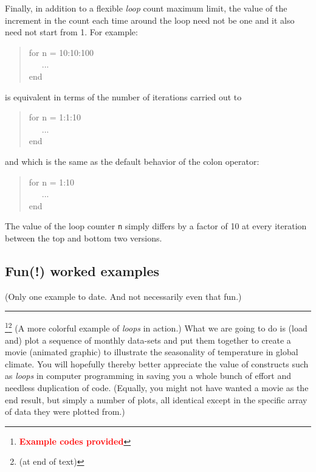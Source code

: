 \documentclass{tufte-book} %
\newenvironment{docspec}{\begin{quotation}\ttfamily\parskip0pt\parindent0pt\ignorespaces}{\end{quotation}}
\begin{document}
\noindent Finally, in addition to a flexible \textit{loop} count maximum limit, the value of the increment in the count each time around the loop need not be one and it also need not start from 1. For example:
\begin{docspec}
for n = 10:10:100
\\ \ \ \ ...
\\end
\end{docspec}
is  equivalent in terms of the number of iterations carried out to
\begin{docspec}
for n = 1:1:10
\\ \ \ \ ...
\\end
\end{docspec}
and which is the same as the default behavior of the colon operator:
\begin{docspec}
for n = 1:10
\\ \ \ \ ...
\\end
\end{docspec}
The value of  the loop counter \texttt{n} simply differs by a factor of 10 at every iteration between the top and bottom two versions.

\newpage 


\subsection{Fun(!) worked examples}

(Only one example to date. And not necessarily even that fun.)

\vspace{1mm}
\noindent\rule{4cm}{0.5pt}
\vspace{-2mm}

\footnote{\textcolor{red}{\textbf{Example codes provided}}}\footnote{(at end of text)} (A more colorful example of \textit{loops} in action.) What we are going to do is (load and) plot a sequence of monthly data-sets and put them together to create a movie (animated graphic) to illustrate the seasonality of temperature in global climate. You will hopefully thereby better appreciate the value of constructs such as \textit{loops} in computer programming in saving you a whole bunch of effort and needless duplication of code. (Equally, you might not have wanted a movie as the end result, but simply a number of plots, all identical except in the specific array of data they were plotted from.)
\end{document}
